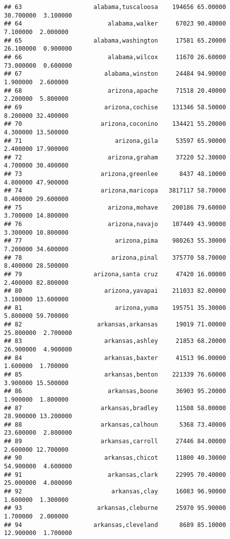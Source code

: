 \documentclass[
]{article}
\begin{document}
\begin{verbatim}
## 63                    alabama,tuscaloosa    194656 65.00000 30.700000  3.100000
## 64                        alabama,walker     67023 90.40000  7.100000  2.000000
## 65                    alabama,washington     17581 65.20000 26.100000  0.900000
## 66                        alabama,wilcox     11670 26.60000 73.000000  0.600000
## 67                       alabama,winston     24484 94.90000  1.900000  2.600000
## 68                        arizona,apache     71518 20.40000  2.200000  5.800000
## 69                       arizona,cochise    131346 58.50000  8.200000 32.400000
## 70                      arizona,coconino    134421 55.20000  4.300000 13.500000
## 71                          arizona,gila     53597 65.90000  2.400000 17.900000
## 72                        arizona,graham     37220 52.30000  4.700000 30.400000
## 73                      arizona,greenlee      8437 48.10000  4.800000 47.900000
## 74                      arizona,maricopa   3817117 58.70000  8.400000 29.600000
## 75                        arizona,mohave    200186 79.60000  3.700000 14.800000
## 76                        arizona,navajo    107449 43.90000  3.300000 10.800000
## 77                          arizona,pima    980263 55.30000  7.200000 34.600000
## 78                         arizona,pinal    375770 58.70000  8.400000 28.500000
## 79                    arizona,santa cruz     47420 16.00000  2.400000 82.800000
## 80                       arizona,yavapai    211033 82.00000  3.100000 13.600000
## 81                          arizona,yuma    195751 35.30000  5.800000 59.700000
## 82                     arkansas,arkansas     19019 71.00000 25.800000  2.700000
## 83                       arkansas,ashley     21853 68.20000 26.900000  4.900000
## 84                       arkansas,baxter     41513 96.00000  1.600000  1.700000
## 85                       arkansas,benton    221339 76.60000  3.900000 15.500000
## 86                        arkansas,boone     36903 95.20000  1.900000  1.800000
## 87                      arkansas,bradley     11508 58.00000 28.900000 13.200000
## 88                      arkansas,calhoun      5368 73.40000 23.600000  2.800000
## 89                      arkansas,carroll     27446 84.00000  2.600000 12.700000
## 90                       arkansas,chicot     11800 40.30000 54.900000  4.600000
## 91                        arkansas,clark     22995 70.40000 25.000000  4.000000
## 92                         arkansas,clay     16083 96.90000  1.600000  1.300000
## 93                     arkansas,cleburne     25970 95.90000  1.700000  2.000000
## 94                    arkansas,cleveland      8689 85.10000 12.900000  1.700000

\end{verbatim}
\end{document}
